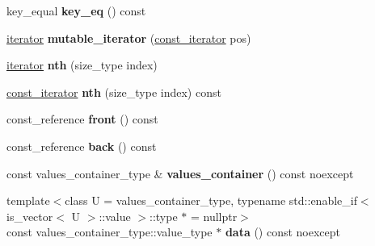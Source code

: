 \begin{DoxyCompactItemize}
key\+\_\+equal {\bfseries key\+\_\+eq} () const
\item 
\mbox{\label{classtsl_1_1detail__ordered__hash_1_1ordered__hash_a5fb283cf1d8f5abcd089ad8b5a3f286c}} 
\mbox{\hyperlink{classtsl_1_1detail__ordered__hash_1_1ordered__hash_1_1ordered__iterator}{iterator}} {\bfseries mutable\+\_\+iterator} (\mbox{\hyperlink{classtsl_1_1detail__ordered__hash_1_1ordered__hash_1_1ordered__iterator}{const\+\_\+iterator}} pos)
\item 
\mbox{\label{classtsl_1_1detail__ordered__hash_1_1ordered__hash_a692e5c6eb40e3226cdea154771ad15f6}} 
\mbox{\hyperlink{classtsl_1_1detail__ordered__hash_1_1ordered__hash_1_1ordered__iterator}{iterator}} {\bfseries nth} (size\+\_\+type index)
\item 
\mbox{\label{classtsl_1_1detail__ordered__hash_1_1ordered__hash_ad061ccba9c6563a0999868384efd461e}} 
\mbox{\hyperlink{classtsl_1_1detail__ordered__hash_1_1ordered__hash_1_1ordered__iterator}{const\+\_\+iterator}} {\bfseries nth} (size\+\_\+type index) const
\item 
\mbox{\label{classtsl_1_1detail__ordered__hash_1_1ordered__hash_a3e4ebf244bb278a214dacb82c69e661e}} 
const\+\_\+reference {\bfseries front} () const
\item 
\mbox{\label{classtsl_1_1detail__ordered__hash_1_1ordered__hash_a647aa3a4fc29fe57de828cab700729c9}} 
const\+\_\+reference {\bfseries back} () const
\item 
\mbox{\label{classtsl_1_1detail__ordered__hash_1_1ordered__hash_a127774d982e8752258333c7ad7d3477c}} 
const values\+\_\+container\+\_\+type \& {\bfseries values\+\_\+container} () const noexcept
\item 
\mbox{\label{classtsl_1_1detail__ordered__hash_1_1ordered__hash_a17820bbf5450c3e26ea4088d0b159dfd}} 
{\footnotesize template$<$class U  = values\+\_\+container\+\_\+type, typename std\+::enable\+\_\+if$<$ is\+\_\+vector$<$ U $>$\+::value $>$\+::type $\ast$  = nullptr$>$ }\\const values\+\_\+container\+\_\+type\+::value\+\_\+type $\ast$ {\bfseries data} () const noexcept

\end{DoxyCompactItemize}
